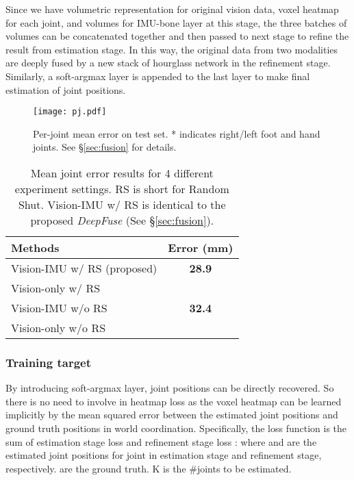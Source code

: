 \documentclass[10pt,twocolumn,letterpaper]{article}
\begin{document}
Since we have volumetric representation for original vision data, voxel heatmap for each joint, and volumes for IMU-bone layer at this stage, the three batches of volumes can be concatenated together and then passed to next stage to refine the result from estimation stage. In this way, the original data from two modalities are deeply fused by a new stack of hourglass network in the refinement stage. Similarly, a soft-argmax layer is appended to the last layer to make final estimation of joint positions. 



\begin{figure}
\begin{center}
\texttt{[image: pj.pdf]}
\end{center}
    \vspace{-0.5cm}
   \caption{Per-joint mean error on test set. * indicates right/left foot and hand joints. See \S\ref{sec:fusion} for details.}
\label{fig:pj}
\end{figure}
\begin{table}
\begin{center}
\begin{tabular}{|l|c|}
\hline
Methods &  Error (mm) \\
\hline\hline
Vision-IMU w/ RS (proposed)& \textbf{28.9} \\
Vision-only w/ RS  &  \\
\hline
Vision-IMU w/o RS  & \textbf{32.4}\\
Vision-only w/o RS &  \\
\hline
\end{tabular}
\end{center}
\vspace{-0.5cm}
\caption{Mean joint error results for 4 different experiment settings. RS is short for Random Shut. Vision-IMU w/ RS is identical to the proposed \emph{DeepFuse} (See \S\ref{sec:fusion}). }
\label{tab:fs}
\vspace*{-14pt}
\end{table}


\vspace{-0.2cm}
\subsubsection{Training target}
By introducing soft-argmax layer, joint positions can be directly recovered. So there is no need to involve in heatmap loss as the voxel heatmap can be learned implicitly by the mean squared error between the estimated joint positions and ground truth positions in world coordination. Specifically, the loss function  is the sum of estimation stage loss  and refinement stage loss : 
where  and  are the estimated joint positions for  joint in estimation stage and refinement stage, respectively.  are the ground truth. K is the \#joints to be estimated. 
\end{document}
